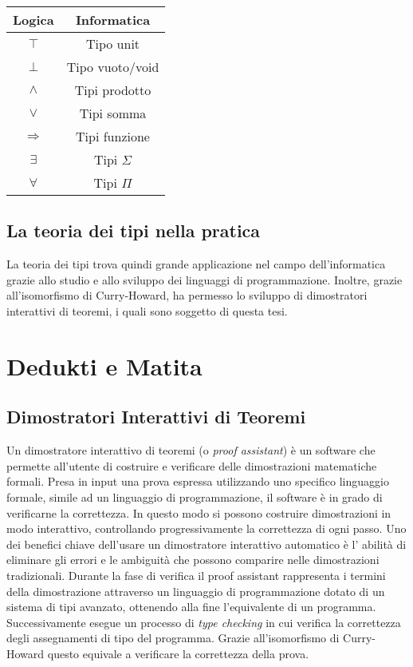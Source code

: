 \documentclass[12pt,a4paper]{report}
\begin{document}
\begin{center}
  \begin{tabular}{ | c | c |}
    \hline
    \textbf{Logica} & \textbf{Informatica} \\
    \hline
    $\top$ & Tipo unit \\
    \hline
    $\bot $ & Tipo vuoto/void \\
    \hline
   $\wedge$ & Tipi prodotto \\  
    \hline
   $\vee$ & Tipi somma \\
    \hline
   $\Rightarrow$ & Tipi funzione \\ 
    \hline
   $\exists$ & Tipi $\Sigma$ \\ 
    \hline
    $\forall $ & Tipi $\Pi$ \\ 
    \hline

  \end{tabular}
\end{center}

\subsection{La teoria dei tipi nella pratica}
La teoria dei tipi trova quindi grande applicazione nel campo dell'informatica
grazie allo studio e allo sviluppo dei linguaggi di programmazione. Inoltre,
grazie all'isomorfismo di Curry-Howard, ha permesso lo sviluppo di dimostratori
interattivi di teoremi, i quali sono soggetto di questa tesi.

\section{Dedukti e Matita}\label{proofAssistant}
\subsection{Dimostratori Interattivi di Teoremi} 
Un dimostratore interattivo di teoremi (o \textit{proof assistant}) è un software 
che permette all'utente di costruire e verificare delle dimostrazioni matematiche
formali. Presa in input una prova espressa utilizzando uno specifico linguaggio 
formale, simile ad un linguaggio di programmazione, il software è in grado di
verificarne la correttezza. In questo modo si possono costruire dimostrazioni
in modo interattivo, controllando progressivamente la correttezza di ogni passo.
Uno dei benefici chiave dell'usare un dimostratore interattivo automatico è l'
abilità di eliminare gli errori e le ambiguità che possono comparire nelle 
dimostrazioni tradizionali. Durante la fase di verifica il proof assistant
rappresenta i termini della dimostrazione attraverso un linguaggio di programmazione
dotato di un sistema di tipi avanzato, ottenendo alla fine l'equivalente di un
programma. Successivamente esegue un processo di \textit{type checking} in cui
verifica la correttezza degli assegnamenti di tipo del programma. Grazie all'isomorfismo
di Curry-Howard questo equivale a verificare la correttezza della prova.
\end{document}
